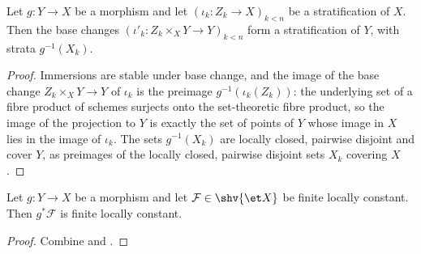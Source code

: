 \begin{lemma}
\label{lemma:constructible-pullback-stratification}
\leanok
Let $g\colon Y\to X$ be a morphism and let $(\iota_k\colon Z_k\to X)_{k<n}$
be a stratification of $X$.  Then the base changes
$(\iota'_k\colon Z_k\times_XY\to Y)_{k<n}$ form a stratification of $Y$,
with strata $g^{-1}(X_k)$.
\end{lemma}
\begin{proof}
\leanok
Immersions are stable under base change, and the image of the base change
$Z_k\times_XY\to Y$ of $\iota_k$ is the preimage $g^{-1}(\iota_k(Z_k))$:
the underlying set of a fibre product of schemes surjects onto the
set-theoretic fibre product, so the image of the projection to $Y$ is
exactly the set of points of $Y$ whose image in $X$ lies in the image of
$\iota_k$.  The sets $g^{-1}(X_k)$ are locally closed, pairwise disjoint and
cover $Y$, as preimages of the locally closed, pairwise disjoint sets $X_k$
covering $X$.
\end{proof}

\begin{lemma}
\label{lemma:constructible-pullback-finite-locally-constant}
\leanok
Let $g\colon Y\to X$ be a morphism and let $\mathcal F\in\shv{\et X}$ be
finite locally constant.  Then $g^*\mathcal F$ is finite locally constant.
\end{lemma}
\begin{proof}
\leanok
Combine  and
.
\end{proof}


